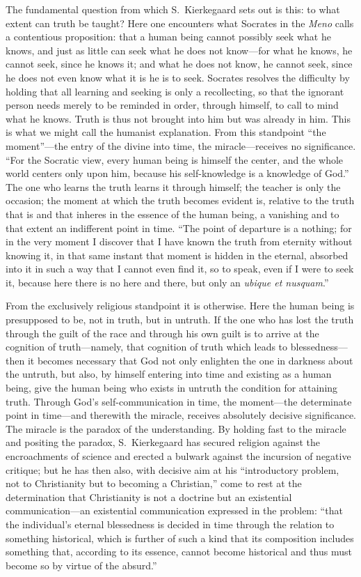 \documentclass[12pt,a4paper]{article}
\begin{document}
The fundamental question from which S.\ Kierkegaard sets out is
this: to what extent can truth be taught? Here one encounters
what Socrates in the \emph{Meno} calls a contentious
proposition: that a human being cannot possibly seek what he
knows, and just as little can seek what he does not know---for
what he knows, he cannot seek, since he knows it; and what he
does not know, he cannot seek, since he does not even know what
it is he is to seek. Socrates resolves the difficulty by holding
that all learning and seeking is only a recollecting, so that
the ignorant person needs merely to be reminded in order,
through himself, to call to mind what he knows. Truth is thus
not brought into him but was already in him. This is what we
might call the humanist explanation. From this standpoint
``the moment''---the entry of the divine into time, the
miracle---receives no significance. ``For the Socratic view,
every human being is himself the center, and the whole world
centers only upon him, because his self-knowledge is a knowledge
of God.'' The one who learns the truth learns it through
himself; the teacher is only the occasion; the moment at which
the truth becomes evident is, relative to the truth that is and
that inheres in the essence of the human being, a vanishing and
to that extent an indifferent point in time. ``The point of
departure is a nothing; for in the very moment I discover that I
have known the truth from eternity without knowing it, in that
same instant that moment is hidden in the eternal, absorbed into
it in such a way that I cannot even find it, so to speak, even
if I were to seek it, because here there is no here and there,
but only an \textit{ubique et nusquam}.''

From the exclusively religious standpoint it is otherwise. Here
the human being is presupposed to be, not in truth, but in
untruth. If the one who has lost the truth through the guilt of
the race and through his own guilt is to arrive at the
cognition of truth---namely, that cognition of truth which leads
to blessedness---then it becomes necessary that God not only
enlighten the one in darkness about the untruth, but also, by
himself entering into time and existing as a human being, give
the human being who exists in untruth the condition for
attaining truth. Through God's self-communication in time, the
moment---the determinate point in time---and therewith the
miracle, receives absolutely decisive significance. The miracle
is the paradox of the understanding. By holding fast to the
miracle and positing the paradox, S.\ Kierkegaard has secured
religion against the encroachments of science and erected a
bulwark against the incursion of negative critique; but he has
then also, with decisive aim at his ``introductory problem, not
to Christianity but to becoming a Christian,'' come to rest at
the determination that Christianity is not a doctrine but an
existential communication---an existential communication
expressed in the problem: ``that the individual's eternal
blessedness is decided in time through the relation to something
historical, which is further of such a kind that its composition
includes something that, according to its essence, cannot become
historical and thus must become so by virtue of the absurd.''
\end{document}
